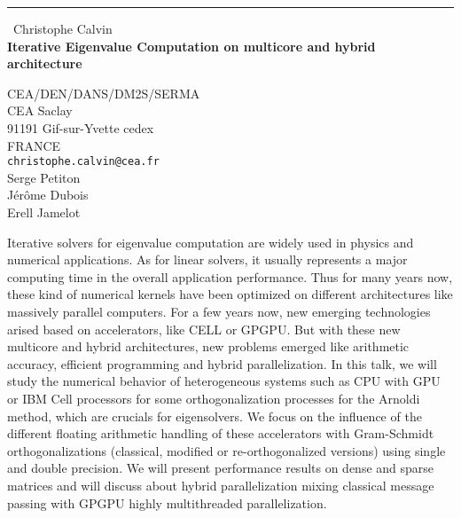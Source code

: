\documentclass{report}
\begin{document}
\begin{center}
\rule{6in}{1pt} \
{\large Christophe Calvin \\
{\bf Iterative Eigenvalue Computation on multicore and hybrid architecture}}

CEA/DEN/DANS/DM2S/SERMA \\ CEA Saclay \\ 91191 Gif-sur-Yvette cedex \\ FRANCE
\\
{\tt christophe.calvin@cea.fr}\\
Serge Petiton\\
J\'er\^ome Dubois\\
Erell Jamelot\end{center}

Iterative solvers for eigenvalue computation are widely used in physics
and numerical applications. As for linear solvers, it usually represents
a major computing time in the overall application performance. Thus for
many years now, these kind of numerical kernels have been optimized on
different architectures like massively parallel computers. For a few
years now, new emerging technologies arised based on accelerators, like
CELL or GPGPU. But with these new multicore and hybrid architectures, new
problems emerged like arithmetic accuracy, efficient programming and
hybrid parallelization.
In this talk, we will study the numerical behavior of heterogeneous
systems such as CPU with GPU or IBM Cell processors for some
orthogonalization processes for the Arnoldi method, which are crucials
for eigensolvers. We focus on the influence of the different floating
arithmetic handling of these accelerators with Gram-Schmidt
orthogonalizations (classical, modified or re-orthogonalized versions)
using single and double precision. We will present performance results on
dense and sparse matrices and will discuss about hybrid parallelization
mixing classical message passing with GPGPU highly multithreaded
parallelization.
\end{document}
